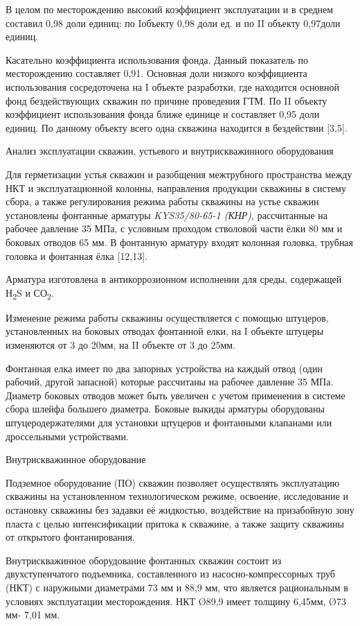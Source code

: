 В целом по месторождению высокий коэффициент эксплуатации и в среднем
составил 0,98 доли единиц: по Iобъекту 0,98 доли ед. и по II объекту
0,97доли единиц.

Касательно коэффициента использования фонда. Данный показатель по
месторождению составляет 0,91. Основная доли низкого коэффициента
использования сосредоточена на I объекте разработки, где находится
основной фонд бездействующих скважин по причине проведения ГТМ. По II
объекту коэффициент использования фонда ближе единице и составляет 0,95
доли единиц. По данному объекту всего одна скважина находится в
бездействии {[}3,5{]}.

Анализ эксплуатации скважин, устьевого и внутрискважинного оборудования

Для герметизации устья скважин и разобщения межтрубного пространства
между НКТ и эксплуатационной колонны, направления продукции скважины в
систему сбора, а также регулирования режима работы скважины на устье
скважин установлены фонтанные арматуры \emph{KYS35/80-65-1 (КНР)},
рассчитанные на рабочее давление 35 МПа, с условным проходом стволовой
части ёлки 80 мм и боковых отводов 65 мм. В фонтанную арматуру входят
колонная головка, трубная головка и фонтанная ёлка {[}12,13{]}.

Арматура изготовлена в антикоррозионном исполнении для среды, содержащей
Н\textsubscript{2}S и СО\textsubscript{2}.

Изменение режима работы скважины осуществляется с помощью штуцеров,
установленных на боковых отводах фонтанной елки, на I объекте штуцеры
изменяются от 3 до 20мм, на II объекте от 3 до 25мм.

Фонтанная елка имеет по два запорных устройства на каждый отвод (один
рабочий, другой запасной) которые рассчитаны на рабочее давление 35 МПа.
Диаметр боковых отводов может быть увеличен с учетом применения в
системе сбора шлейфа большего диаметра. Боковые выкиды арматуры
оборудованы штуцеродержателями для установки щтуцеров и фонтанными
клапанами или дроссельными устройствами.

Внутрискважинное оборудование

Подземное оборудование (ПО) скважин позволяет осуществлять эксплуатацию
скважины на установленном технологическом режиме, освоение, исследование
и остановку скважины без задавки её жидкостью, воздействие на
призабойную зону пласта с целью интенсификации притока к скважине, а
также защиту скважины от открытого фонтанирования.

Внутрискважинное оборудование фонтанных скважин состоит из
двухступенчатого подъемника, составленного из насосно-компрессорных труб
(НКТ) с наружными диаметрами 73 мм и 88,9 мм, что является рациональным
в условиях эксплуатации месторождения. НКТ Ø89,9 имеет толщину 6,45мм,
Ø73 мм- 7,01 мм.

